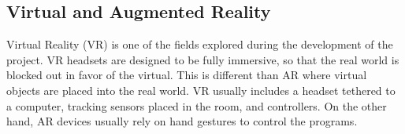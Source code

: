
\subsection{Virtual and Augmented Reality}


    Virtual Reality (VR) is one of the fields explored during the development of the project.  VR headsets are designed to be fully immersive, so that the real world is blocked out in favor of the virtual.  This is different than AR where virtual objects are placed into the real world.  VR usually includes a headset tethered to a computer, tracking sensors placed in the room, and controllers.  On the other hand, AR devices usually rely on hand gestures to control the programs.

	

    